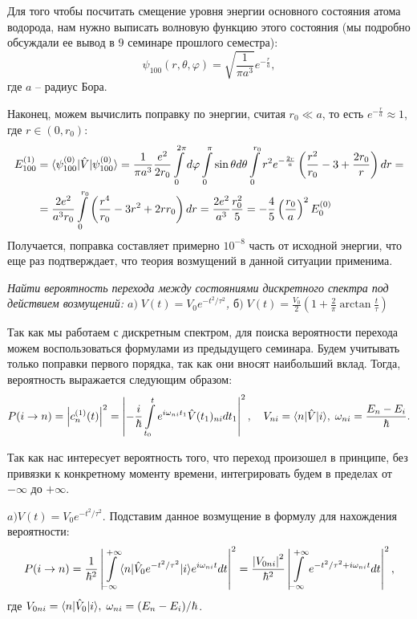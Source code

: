 Для того чтобы посчитать смещение уровня энергии основного состояния атома
водорода, нам нужно выписать волновую функцию этого состояния (мы подробно
обсуждали ее вывод в $9$ семинаре прошлого семестра):
\[
  \psi_{100}(r, \theta, \varphi) = \sqrt{\frac{1}{\pi a^3}}e^{-\frac{r}{a}},
\]
где $a$ -- радиус Бора.

Наконец, можем вычислить поправку по энергии, считая $r_0 \ll a$, то есть
$e^{-\frac{r}{a}}\approx 1$, где $r\in(0, r_0)$:
\begin{align*}
  E_{100}^{(1)} &= \langle\psi_{100}^{(0)}\rvert\hat{V}\lvert\psi_{100}^{(0)}\rangle = \frac{1}{\pi a^3} \frac{e^2}{2r_0} \int\limits_{0}^{2\pi}d\varphi\int\limits_{0}^{\pi}\sin\theta d\theta\int\limits_{0}^{r_0}r^2e^{-\frac{2r}{a}}\left(\frac{r^2}{r_0}-3+\frac{2r_0}{r}\right)dr = \\
  &= \frac{2e^2}{a^3r_0}\int\limits_0^{r_0}\left(\frac{r^4}{r_0}-3r^2+2rr_0\right)dr = \frac{2e^2}{a^3}\frac{r_0^2}{5} = -\frac{4}{5}\left(\frac{r_0}{a}\right)^2E_0^{(0)}
\end{align*}
Получается, поправка составляет примерно $10^{-8}$ часть от исходной энергии,
что еще раз подтверждает, что теория возмущений в данной ситуации применима.
\qedsq

\begin{exercise}
  \textit{Найти вероятность перехода между состояниями дискретного спектра под
    действием возмущений: $a) \; V(t) = V_0 e^{-t^2/\tau^2}$, $\textit{б}) \; V(t)
      = \frac{V_0}{2}\left(1+\frac{2}{\pi}\arctan\frac{t}{\tau}\right)$}
\end{exercise}

Так как мы работаем с дискретным спектром, для поиска вероятности перехода
можем воспользоваться формулами из предыдущего семинара. Будем учитывать только
поправки первого порядка, так как они вносят наибольший вклад. Тогда,
вероятность выражается следующим образом:
\[
  P(i\to n) = \left|c_n^{(1)}(t)\right|^2 = \left|-\frac{i}{\hbar}\int\limits_{t_0}^t e^{i\omega_{ni}t_1}\hat{V}(t_1)_{ni}dt_1\right|^2, \quad V_{ni} = \langle n\rvert\hat{V}\lvert i\rangle, \; \omega_{ni} = \frac{E_n-E_i}{\hbar}.
\]

Так как нас интересует вероятность того, что переход произошел в принципе, без
привязки к конкретному моменту времени, интегрировать будем в пределах от
$-\infty$ до $+\infty$.

$a) V(t) = V_0 e^{-t^2/\tau^2}$. Подставим данное возмущение в формулу для
нахождения вероятности:
\begin{align*}
  P(i\to n) = \frac{1}{\hbar^2}\left|\int\limits_{-\infty}^{+\infty}\langle n\rvert\hat{V}_0 e^{-t^2/\tau^2}\lvert i\rangle e^{i\omega_{ni}t}dt\right|^2 = \frac{\left|V_{0ni}\right|^2}{\hbar^2}\left|\int\limits_{-\infty}^{+\infty}e^{-t^2/\tau^2+i\omega_{ni}t}dt\right|^2,
\end{align*}
где $V_{0ni} = \langle n\rvert\hat{V}_0\lvert i\rangle, \; \omega_{ni} = (E_n-E_i)/\hbar$.

